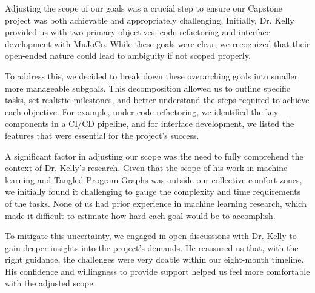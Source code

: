 \documentclass{article}
\begin{document}
\begin{enumerate}
    Adjusting the scope of our goals was a crucial step to ensure our Capstone project was both achievable and appropriately challenging. Initially, Dr. Kelly provided us with two primary objectives: code refactoring and interface development with MuJoCo. While these goals were clear, we recognized that their open-ended nature could lead to ambiguity if not scoped properly.

    To address this, we decided to break down these overarching goals into smaller, more manageable subgoals. This decomposition allowed us to outline specific tasks, set realistic milestones, and better understand the steps required to achieve each objective. For example, under code refactoring, we identified the key components in a CI/CD pipeline, and for interface development, we listed the features that were essential for the project's success.

    A significant factor in adjusting our scope was the need to fully comprehend the context of Dr. Kelly's research. Given that the scope of his work in machine learning and Tangled Program Graphs was outside our collective comfort zones, we initially found it challenging to gauge the complexity and time requirements of the tasks. None of us had prior experience in machine learning research, which made it difficult to estimate how hard each goal would be to accomplish.

    To mitigate this uncertainty, we engaged in open discussions with Dr. Kelly to gain deeper insights into the project's demands. He reassured us that, with the right guidance, the challenges were very doable within our eight-month timeline. His confidence and willingness to provide support helped us feel more comfortable with the adjusted scope.

\end{enumerate}  
\end{document}

